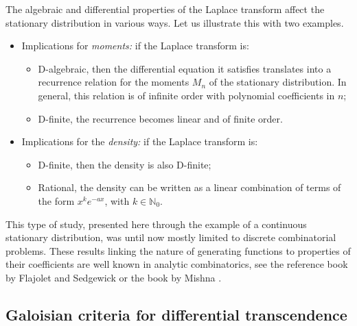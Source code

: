 \documentclass[11pt]{article}
\theoremstyle{definition}
\begin{document}
The algebraic and differential properties of the Laplace transform affect the stationary distribution in various ways. Let us illustrate this with two examples.

\begin{itemize}  
\item[]{Implications for \em{moments}:} 
if the Laplace transform is:
\begin{itemize}
\item {D-algebraic}, then the differential equation it satisfies translates into a recurrence relation for the moments $M_n$ of the stationary distribution. In general, this relation is of infinite order with polynomial coefficients in \( n \);
\item {D-finite}, the recurrence becomes linear and of finite order.
\end{itemize}
\item[]{Implications for the \em{density}:}
if the Laplace transform is:
\begin{itemize}
\item {D-finite}, then the density is also D-finite;
\item {Rational}, the density can be written as a linear combination of terms of the form \( x^k e^{-ax} \), with \( k \in \mathbb{N}_0 \).  
\end{itemize} 
\end{itemize}

This type of study, presented here through the example of a continuous stationary distribution, was until now mostly limited to discrete combinatorial problems. These results linking the nature of generating functions to properties of their coefficients are well known in analytic combinatorics, see the reference book by Flajolet and Sedgewick \cite{Flajolet_Sedgewick_2009} or the book by Mishna \cite{Mishna2020}.






\subsection{Galoisian criteria for differential transcendence}
\label{subsec:difftranscriteria}
\end{document}
